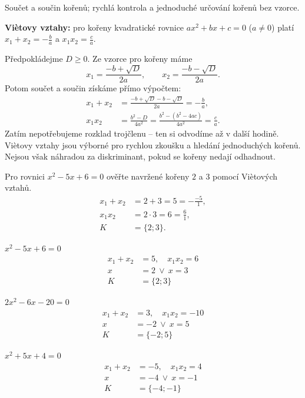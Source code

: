 \documentclass[11pt,a4paper]{article}
\begin{document}
Součet a součin kořenů; rychlá kontrola a jednoduché určování kořenů bez vzorce.
\begin{definiceBox}[title={Věta - Viètovy vztahy}]
\textbf{Viètovy vztahy:} pro kořeny kvadratické rovnice $ax^2+bx+c=0$ ($a\ne0$) platí $x_1+x_2=-\frac ba$ a $x_1x_2=\frac ca$.
\end{definiceBox}
Předpokládejme $D\ge0$. Ze vzorce pro kořeny máme
\[x_1=\frac{-b+\sqrt D}{2a},\qquad x_2=\frac{-b-\sqrt D}{2a}.\]
Potom součet a součin získáme přímo výpočtem:
\[
\begin{aligned}
x_1+x_2&=\frac{-b+\sqrt D-b-\sqrt D}{2a}=-\frac ba,\\
x_1x_2&=\frac{b^2-D}{4a^2}
=\frac{b^2-(b^2-4ac)}{4a^2}=\frac ca.
\end{aligned}
\]
Zatím nepotřebujeme rozklad trojčlenu -- ten si odvodíme až v další hodině.
Viètovy vztahy jsou výborné pro rychlou zkoušku a hledání jednoduchých kořenů.
Nejsou však náhradou za diskriminant, pokud se kořeny nedají odhadnout.
\begin{prikladReseniBox}[title={Příklad 1}]
Pro rovnici $x^2-5x+6=0$ ověřte navržené kořeny $2$ a $3$ pomocí Viètových vztahů.
\tcblower
\[\begin{aligned}
x_1+x_2&=2+3=5=-\frac{-5}{1},\\
x_1x_2&=2\cdot3=6=\frac61,\\
K&=\{2;3\}.
\end{aligned}\]
\end{prikladReseniBox}
\begin{prikladReseniBox}[title={Příklad 2}]
$x^{2} - 5x + 6=0$
\tcblower
\[
\begin{aligned}
x_1+x_2&=5,\quad x_1x_2=6\\[2pt]
x&=2\ \vee\ x=3\\[2pt]
K&=\{2;3\}
\end{aligned}
\]
\end{prikladReseniBox}
\begin{prikladReseniBox}[title={Příklad 3}]
$2x^{2} - 6x - 20=0$
\tcblower
\[
\begin{aligned}
x_1+x_2&=3,\quad x_1x_2=-10\\[2pt]
x&=-2\ \vee\ x=5\\[2pt]
K&=\{-2;5\}
\end{aligned}
\]
\end{prikladReseniBox}
\begin{prikladReseniBox}[title={Příklad 4}]
$x^{2} + 5x + 4=0$
\tcblower
\[
\begin{aligned}
x_1+x_2&=-5,\quad x_1x_2=4\\[2pt]
x&=-4\ \vee\ x=-1\\[2pt]
K&=\{-4;-1\}
\end{aligned}
\]
\end{prikladReseniBox}
\end{document}
